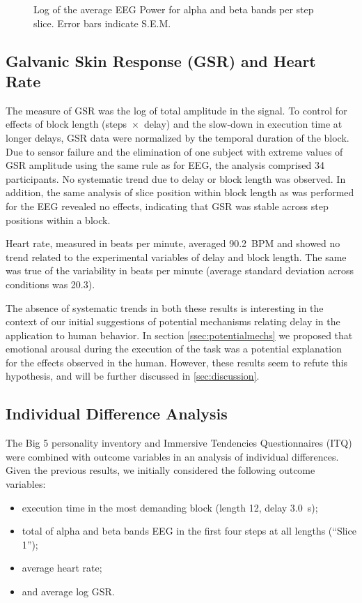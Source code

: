\documentclass[10pt,letterpaper]{article}
\begin{document}
\begin{figure}[h]
    \centering
    \caption{Log of the average EEG Power for alpha and beta bands per step slice. Error bars indicate S.E.M.}\label{fig:logeegpow:slices}
\end{figure}

\subsection{Galvanic Skin Response (GSR) and Heart Rate}
The measure of GSR was the log of total amplitude in the signal.
To control for effects of block length (steps~\( \times \)~delay) and the slow-down in execution time at longer delays, GSR data were normalized by the temporal duration of the block.
Due to sensor failure and the elimination of one subject with extreme values of GSR amplitude using the same rule as for EEG, the analysis comprised 34 participants.
No systematic trend due to delay or block length was observed.
In addition, the same analysis of slice position within block length as was performed for the EEG revealed no effects, indicating that GSR was stable across step positions within a block. 

Heart rate, measured in beats per minute, averaged \num{90.2}~BPM and showed no trend related to the experimental variables of delay and block length.
The same was true of the variability in beats per minute (average standard deviation across conditions was \num{20.3}).

The absence of systematic trends in both these results is interesting in the context of our initial suggestions of potential mechanisms relating delay in the application to human behavior.
In section \cref{ssec:potentialmechs} we proposed that emotional arousal during the execution of the task was a potential explanation for the effects observed in the human.
However, these results seem to refute this hypothesis, and will be further discussed in \cref{sec:discussion}.

\subsection{Individual Difference Analysis}

The Big 5 personality inventory and Immersive Tendencies Questionnaires (ITQ) were combined with outcome variables in an analysis of individual differences.
Given the previous results, we initially considered the following outcome variables:
\begin{itemize}
    \item execution time in the most demanding block (length 12, delay \SI{3.0}{\second}); 
    \item total of alpha and beta bands EEG in the first four steps at all lengths (``Slice 1'');
    \item average heart rate;
    \item and average log GSR.\@
\end{itemize}
\end{document}
